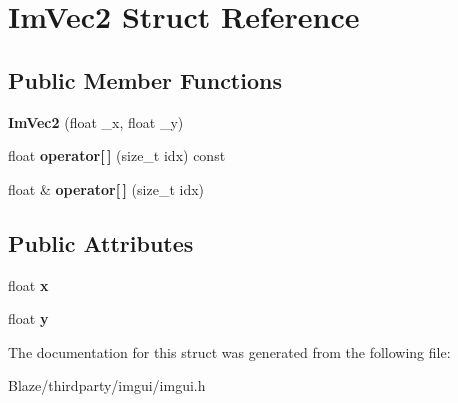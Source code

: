 \hypertarget{structImVec2}{}\section{Im\+Vec2 Struct Reference}
\label{structImVec2}
\subsection*{Public Member Functions}
\begin{DoxyCompactItemize}
\item 
\mbox{\label{structImVec2_af2fd51a6c4bf6290676b235533b92c0d}} 
{\bfseries Im\+Vec2} (float \+\_\+x, float \+\_\+y)
\item 
\mbox{\label{structImVec2_ab9d53b9da1e51a5f38ba99bf5522c7f0}} 
float {\bfseries operator\mbox{[}$\,$\mbox{]}} (size\+\_\+t idx) const
\item 
\mbox{\label{structImVec2_a04b75dbf3885c5cb9fe0da28471e313a}} 
float \& {\bfseries operator\mbox{[}$\,$\mbox{]}} (size\+\_\+t idx)
\end{DoxyCompactItemize}
\subsection*{Public Attributes}
\begin{DoxyCompactItemize}
\item 
\mbox{\label{structImVec2_a5802a68560961ed8cb8cc5fb2a244c2d}} 
float {\bfseries x}
\item 
\mbox{\label{structImVec2_a1f9d136ca837e147b793b19d25a3a618}} 
float {\bfseries y}
\end{DoxyCompactItemize}


The documentation for this struct was generated from the following file\+:\begin{DoxyCompactItemize}
\item 
Blaze/thirdparty/imgui/imgui.\+h\end{DoxyCompactItemize}
